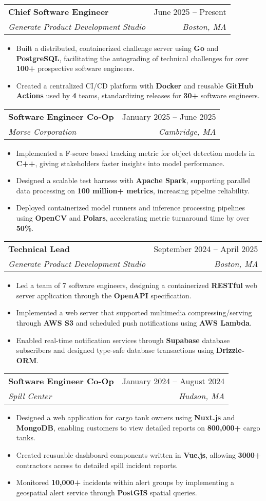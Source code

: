 \documentclass[letterpaper,11pt]{article}
\makeatletter
\newcommand{\resumeItem}[1]{
  \item\small{
    {#1 \vspace{-2pt}}
  }
}
\newcommand{\resumeSubheading}[4]{
  \vspace{-2pt}\item
    \begin{tabular*}{0.97\textwidth}[t]{l@{\extracolsep{\fill}}r}
      \textbf{#1} & #2 \\
      \textit{\small#3} & \textit{\small #4} \\
    \end{tabular*}\vspace{-7pt}
}
\newcommand{\resumeSubSubheading}[2]{
    \item
    \begin{tabular*}{0.97\textwidth}{l@{\extracolsep{\fill}}r}
      \textit{\small#1} & \textit{\small #2} \\
    \end{tabular*}\vspace{-7pt}
}
\newcommand{\resumeSubHeadingListEnd}{\end{itemize}}
\newcommand{\resumeItemListStart}{\begin{itemize}}
\newcommand{\resumeItemListEnd}{\end{itemize}\vspace{-5pt}}
\makeatother
\begin{document}
\resumeSubheading
{Chief Software Engineer}{June 2025 -- Present}
{Generate Product Development Studio}{Boston, MA}
\resumeItemListStart
\resumeItem { Built a distributed, containerized challenge server using \textbf{Go} and \textbf{PostgreSQL}, facilitating the autograding of technical challenges for over \textbf{100+} prospective software engineers. }
\resumeItem { Created a centralized CI/CD platform with \textbf{Docker} and reusable \textbf{GitHub Actions} used by \textbf{4} teams, standardizing releases for \textbf{30+} software engineers. }
\resumeItemListEnd

\resumeSubheading
{Software Engineer Co-Op}{January 2025 -- June 2025}
{Morse Corporation}{Cambridge, MA}
\resumeItemListStart
\resumeItem { Implemented a  F-score based tracking metric for object detection models in \textbf{C++}, giving stakeholders faster insights into model performance. }
\resumeItem { Designed a scalable test harness with \textbf{Apache Spark}, supporting parallel data processing on \textbf{100 million+ metrics}, increasing pipeline reliability.}
\resumeItem { Deployed containerized model runners and inference processing pipelines using \textbf{OpenCV} and \textbf{Polars}, accelerating metric turnaround time by over \textbf{50\%}. }
\resumeItemListEnd


\resumeSubheading
{Technical Lead}{September 2024 -- April 2025}
{Generate Product Development Studio}{Boston, MA}
\resumeItemListStart
\resumeItem { Led a team of 7 software engineers, designing a containerized \textbf{RESTful} web server application through the \textbf{OpenAPI} specification.}
\resumeItem{
	Implemented a web server that supported multimedia compressing/serving through \textbf{AWS S3} and scheduled push notifications using \textbf{AWS Lambda}.
}
\resumeItem { Enabled real-time notification services through \textbf{Supabase} database subscribers and designed type-safe database transactions using \textbf{Drizzle-ORM}.}
\resumeItemListEnd

\resumeSubheading
{Software Engineer Co-Op}{January 2024 -- August 2024}
{Spill Center}{Hudson, MA}
\resumeItemListStart
\resumeItem { Designed a web application for cargo tank owners using \textbf{Nuxt.js} and \textbf{MongoDB}, enabling customers to view detailed reports on \textbf{800,000+} cargo tanks. }
\resumeItem { Created reusuable dashboard components written in \textbf{Vue.js}, allowing \textbf{3000+} contractors access to detailed spill incident reports.   }
\resumeItem { Monitored \textbf{10,000+} incidents within alert groups by implementing a geospatial alert service through \textbf{PostGIS} spatial queries. }
\resumeItemListEnd
\end{document}
